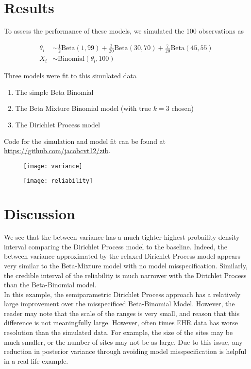 \documentclass{article}
\begin{document}
\section{Results}

To assess the performance of these models, we simulated the 100 observations as

\begin{equation}\label{eq:data-sim}
    \begin{split}
    \theta_i &\sim \frac{1}{2} \text{Beta}(1, 99) + \frac{3}{20} \text{Beta}(30, 70) +\frac{7}{20} \text{Beta}(45, 55) \\
    X_i &\sim \text{Binomial}(\theta_i, 100)
    \end{split}
\end{equation}

Three models were fit to this simulated data

\begin{enumerate}[1]
    \item The simple Beta Binomial
    \item The Beta Mixture Binomial model (with true $k=3$ chosen)
    \item The Dirichlet Process model
\end{enumerate}

Code for the simulation and model fit can be found at \url{https://github.com/jacobcvt12/zib}.

\begin{figure}
\texttt{[image: variance]}
\end{figure}

\begin{figure}
\texttt{[image: reliability]}
\end{figure}

\section{Discussion}

We see that the between variance has a much tighter highest probaility density interval comparing the Dirichlet Process model to the baseline. Indeed, the between variance approximated by the relaxed Dirichlet Process model appears very similar to the Beta-Mixture model with no model misspecification. Similarly, the credible interval of the reliability is much narrower with the Dirichlet Process than the Beta-Binomial model. \\

In this example, the semiparametric Dirichlet Process approach has a relatively large improvement over the misspecificed Beta-Binomial Model. However, the reader may note that the scale of the ranges is very small, and reason that this difference is not meaningfully large. However, often times EHR data has worse resolution than the simulated data. For example, the size of the sites may be much smaller, or the number of sites may not be as large. Due  to this issue, any reduction in posterior variance through avoiding model misspecification is helpful in a real life example.


\end{document}
